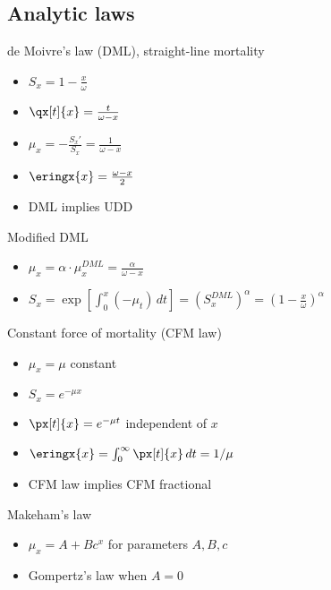 \subsection{Analytic laws}

de Moivre's law (DML), straight-line mortality
\begin{itemize}
\item $S_x = 1 - \frac{x}{\omega}$
\item $\qx[t]{x} = \frac{t}{\omega - x}$
\item $\mu_x = -\frac{S_x'}{S_x} = \frac{1}{\omega - x}$
\item $\eringx{x} = \frac{\omega - x}{2}$
\item DML implies UDD
\end{itemize}

Modified DML
\begin{itemize}
\item $\mu_x = \alpha\cdot\mu_x^{DML} = \frac{\alpha}{\omega - x}$
\item $S_x = \exp\left[\int_0^x (-\mu_t)\,dt\right] = (S_x^{DML})^{\alpha} = (1 - \frac{x}{\omega})^{\alpha}$
\end{itemize}

Constant force of mortality (CFM law)
\begin{itemize}
\item $\mu_x = \mu$ constant
\item $S_x = e^{-\mu x}$
\item $\px[t]{x} = e^{-\mu t}$ independent of $x$
\item $\eringx{x} = \int_0^{\infty}\px[t]{x}\,dt = 1/\mu$
\item CFM law implies CFM fractional
\end{itemize}

Makeham's law
\begin{itemize}
\item $\mu_x = A + Bc^x$ for parameters $A,B,c$
\item Gompertz's law when $A = 0$
\end{itemize}